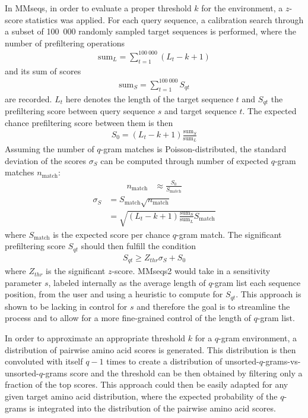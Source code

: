 In MMseqs, in order to evaluate a proper threshold \(k\) for the environment, a \(z\)-score statistics was applied. For each query sequence, a calibration search through a subset of 100~000 randomly sampled target sequences is performed, where the number of prefiltering operations
\begin{align}
    \text{sum}_L = \sum_{t=1}^{100~000} (L_t-k+1)
\end{align}
and its sum of scores
\begin{align}
    \text{sum}_S = \sum_{t=1}^{100~000} S_{qt}
\end{align}
are recorded. \(L_t\) here denotes the length of the target sequence \(t\) and \(S_{qt}\) the prefiltering score between query sequence \(s\) and target sequence \(t\). The expected chance prefiltering score between them is then
\begin{align}
    S_0 = (L_t-k+1)\frac{\text{sum}_S}{\text{sum}_L}
\end{align}
Assuming the number of \(q\)-gram matches is Poisson-distributed, the standard deviation of the scores \(\sigma_S\) can be computed through number of expected \(q\)-gram matches \(n_{\text{match}}\):
\begin{align}
    n_{\text{match}} &\approx \frac{S_0}{S_{\text{match}}}
\end{align}
\begin{align}
    \sigma_S &= S_{\text{match}}\sqrt{n_{\text{match}}}\\
    &= \sqrt{(L_t-k+1)\frac{\text{sum}_S}{\text{sum}_L}S_{\text{match}}}
\end{align}
where \(S_{\text{match}}\) is the expected score per chance \(q\)-gram match. The significant prefiltering score \(S_{qt}\) should then fulfill the condition
\begin{align}
    S_{qt} \geq Z_{thr}\sigma_S + S_0
\end{align}
where \(Z_{thr}\) is the significant \(z\)-score. MMseqs2 would take in a sensitivity parameter \(s\), labeled internally as the average length of \(q\)-gram list each sequence position, from the user and using a heuristic to compute for \(S_{qt}\). This approach is shown to be lacking in control for \(s\) and therefore the goal is to streamline the process and to allow for a more fine-grained control of the length of \(q\)-gram list. 

In order to approximate an appropriate threshold \(k\) for a \(q\)-gram environment, a distribution of pairwise amino acid scores is generated. This distribution is then convoluted with itself \(q-1\) times to create a distribution of unsorted-$q$-grams-vs-unsorted-$q$-grams score and the threshold can be then obtained by filtering only a fraction of the top scores. This approach could then be easily adapted for any given target amino acid distribution, where the expected probability of the \(q\)-grams is integrated into the distribution of the pairwise amino acid scores. %
